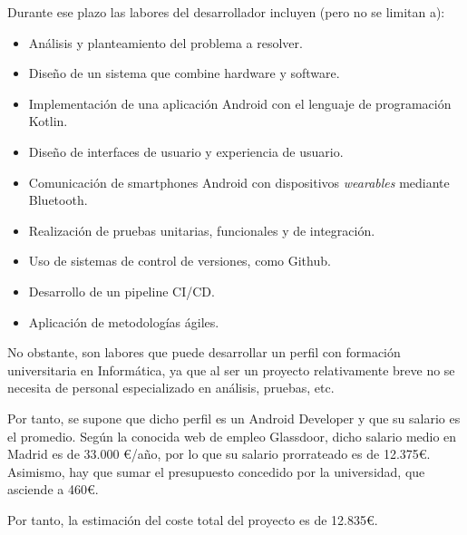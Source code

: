                 Durante ese plazo las labores del desarrollador incluyen (pero no se limitan a):
                \begin{itemize}
                    \item Análisis y planteamiento del problema a resolver.
                    \item Diseño de un sistema que combine hardware y software.
                    \item Implementación de una aplicación Android con el lenguaje de programación Kotlin.
                    \item Diseño de interfaces de usuario y experiencia de usuario. 
                    \item Comunicación de smartphones Android con dispositivos \textit{wearables} mediante Bluetooth.
                    \item Realización de pruebas unitarias, funcionales y de integración.
                    \item Uso de sistemas de control de versiones, como Github.
                    \item Desarrollo de un pipeline CI/CD.
                    \item Aplicación de metodologías ágiles.
                \end{itemize}
                
                No obstante, son labores que puede desarrollar un perfil con formación universitaria en Informática, ya que al ser un proyecto relativamente breve no se necesita de personal especializado en análisis, pruebas, etc. 
                
                Por tanto, se supone que dicho perfil es un Android Developer y que su salario es el promedio. Según la conocida web de empleo Glassdoor, dicho salario medio en Madrid es de 33.000 €/año, por lo que su salario prorrateado es de 12.375€. Asimismo, hay que sumar el presupuesto concedido por la universidad, que asciende a 460€.
                
                Por tanto, la estimación del coste total del proyecto es de 12.835€.


